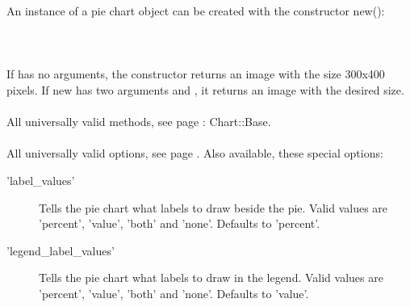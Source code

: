  An instance of a pie chart object can be created with the constructor new():\\
\\
\\
\\
If  has no arguments, the constructor returns an image with the size 300x400 pixels. If new has two arguments  and , it returns an image with the desired size. \\ 
\\ 
All universally valid methods, see page \pageref{methods}: Chart::Base. \\
\\
 All universally valid options, see page \pageref{options}. Also available, these special options:
\begin{description}
\item['label\_values'] Tells the pie chart what labels to draw beside the pie. Valid values are 'percent', 'value', 'both' and 'none'. Defaults to 'percent'.
\item['legend\_label\_values'] Tells the pie chart what labels to draw in the legend. Valid values are 'percent', 'value', 'both' and 'none'. Defaults to 'value'.
\end{description}